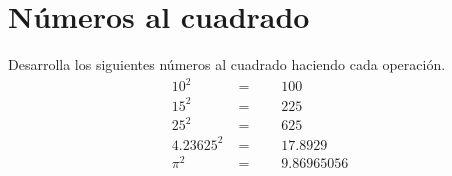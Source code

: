 \documentclass[11pt]{article}
\begin{document}
\section{N\'umeros al cuadrado}
Desarrolla los siguientes n\'umeros al cuadrado haciendo cada operaci\'on. 
\begin{align}
10^{2}  &= \qquad 100 \\ 
15^{2}  &= \qquad 225 \\
25^{2}  &= \qquad 625 \\
4.23625^{2} &= \qquad 17.8929\\
\pi^{2} &= \qquad 9.86965056
\end{align}
\end{document}
